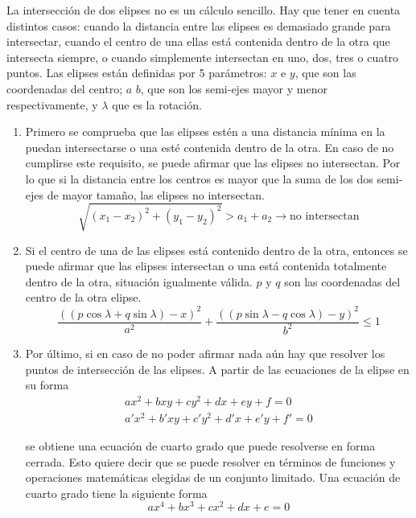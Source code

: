 La intersección de dos elipses no es un cálculo sencillo. Hay que tener en cuenta distintos casos: cuando la distancia entre las elipses es demasiado grande para intersectar, cuando el centro de una ellas está contenida dentro de la otra que intersecta siempre, o cuando simplemente intersectan en uno, dos, tres o cuatro puntos. Las elipses están definidas por 5 parámetros: $x$ e $y$, que son las coordenadas del centro; $a$  $b$, que son los semi-ejes mayor y menor respectivamente, y $\lambda$ que es la rotación. \\

\begin{enumerate}

\item Primero se comprueba que las elipses estén a una distancia mínima en la puedan intersectarse o una esté contenida dentro de la otra. En caso de no cumplirse este requisito, se puede afirmar que las elipses no intersectan. Por lo que si la distancia entre los centros es mayor que la suma de los dos semi-ejes de mayor tamaño, las elipses no intersectan.
\begin{equation}
  \sqrt{ (x_1 - x_2)^2 + (y_1 - y_2)^2 } > a_1 + a_2 \rightarrow \text{no intersectan}
\end{equation}

\item Si el centro de una de las elipses está contenido dentro de la otra, entonces se puede afirmar que las elipses intersectan o una está contenida totalmente dentro de la otra, situación igualmente válida. $p$ y $q$ son las coordenadas del centro de la otra elipse.
\begin{equation}
  \frac{ ((p \cos \lambda + q \sin \lambda ) - x)^2 }{ a^2 } + 
  \frac{ ((p \sin \lambda - q \cos \lambda ) - y)^2 }{ b^2 } \leq 1
\end{equation}

\item Por último, si en caso de no poder afirmar nada aún hay que resolver los puntos de intersección de las elipses. A partir de las ecuaciones de la elipse en su forma
\begin{equation}
  \begin{split}
  ax^2  + bxy  + cy^2  + dx  + ey  + f = 0 \\
  a'x^2 + b'xy + c'y^2 + d'x + e'y + f' = 0    
  \end{split}
\end{equation}

se obtiene una ecuación de cuarto grado que puede resolverse en forma cerrada. Esto quiere decir que se puede resolver en términos de funciones y operaciones matemáticas elegidas de un conjunto limitado. Una ecuación de cuarto grado tiene la siguiente forma
\begin{equation}
  ax^4 + bx^3 + cx^2 + dx + e = 0
\end{equation}


\end{enumerate}
